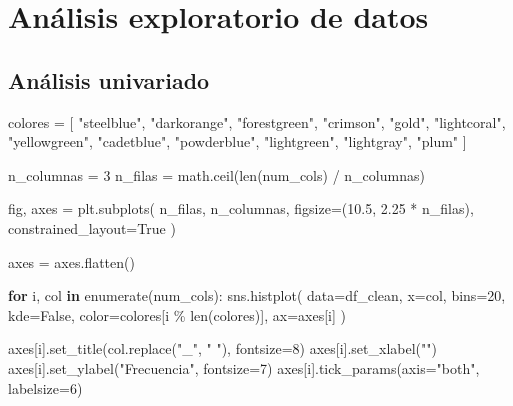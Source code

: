 \documentclass[11pt,spanish,a4paper,]{article}
\newenvironment{Shaded}{\begin{snugshade}}{\end{snugshade}}
\newcommand{\BuiltInTok}[1]{\textcolor[rgb]{0.00,0.23,0.31}{#1}}
\newcommand{\ControlFlowTok}[1]{\textcolor[rgb]{0.00,0.23,0.31}{\textbf{#1}}}
\newcommand{\DecValTok}[1]{\textcolor[rgb]{0.68,0.00,0.00}{#1}}
\newcommand{\FloatTok}[1]{\textcolor[rgb]{0.68,0.00,0.00}{#1}}
\newcommand{\KeywordTok}[1]{\textcolor[rgb]{0.00,0.23,0.31}{\textbf{#1}}}
\newcommand{\NormalTok}[1]{\textcolor[rgb]{0.00,0.23,0.31}{#1}}
\newcommand{\OperatorTok}[1]{\textcolor[rgb]{0.37,0.37,0.37}{#1}}
\newcommand{\StringTok}[1]{\textcolor[rgb]{0.13,0.47,0.30}{#1}}
\newcommand{\VariableTok}[1]{\textcolor[rgb]{0.07,0.07,0.07}{#1}}
\begin{document}
\newpage

\section{Análisis exploratorio de
datos}\label{anuxe1lisis-exploratorio-de-datos}

\subsection{Análisis univariado}\label{anuxe1lisis-univariado}

\begin{Shaded}
\begin{Highlighting}[]
\NormalTok{colores }\OperatorTok{=}\NormalTok{ [}
    \StringTok{"steelblue"}\NormalTok{, }\StringTok{"darkorange"}\NormalTok{, }\StringTok{"forestgreen"}\NormalTok{,}
    \StringTok{"crimson"}\NormalTok{, }\StringTok{"gold"}\NormalTok{, }\StringTok{"lightcoral"}\NormalTok{,}
    \StringTok{"yellowgreen"}\NormalTok{, }\StringTok{"cadetblue"}\NormalTok{, }\StringTok{"powderblue"}\NormalTok{,}
    \StringTok{"lightgreen"}\NormalTok{, }\StringTok{"lightgray"}\NormalTok{, }\StringTok{"plum"}
\NormalTok{]}

\NormalTok{n\_columnas }\OperatorTok{=} \DecValTok{3}
\NormalTok{n\_filas }\OperatorTok{=}\NormalTok{ math.ceil(}\BuiltInTok{len}\NormalTok{(num\_cols) }\OperatorTok{/}\NormalTok{ n\_columnas)}

\NormalTok{fig, axes }\OperatorTok{=}\NormalTok{ plt.subplots(}
\NormalTok{    n\_filas,}
\NormalTok{    n\_columnas,}
\NormalTok{    figsize}\OperatorTok{=}\NormalTok{(}\FloatTok{10.5}\NormalTok{, }\FloatTok{2.25} \OperatorTok{*}\NormalTok{ n\_filas),}
\NormalTok{    constrained\_layout}\OperatorTok{=}\VariableTok{True}
\NormalTok{)}

\NormalTok{axes }\OperatorTok{=}\NormalTok{ axes.flatten()}

\ControlFlowTok{for}\NormalTok{ i, col }\KeywordTok{in} \BuiltInTok{enumerate}\NormalTok{(num\_cols):}
\NormalTok{    sns.histplot(}
\NormalTok{        data}\OperatorTok{=}\NormalTok{df\_clean,}
\NormalTok{        x}\OperatorTok{=}\NormalTok{col,}
\NormalTok{        bins}\OperatorTok{=}\DecValTok{20}\NormalTok{,}
\NormalTok{        kde}\OperatorTok{=}\VariableTok{False}\NormalTok{,}
\NormalTok{        color}\OperatorTok{=}\NormalTok{colores[i }\OperatorTok{\%} \BuiltInTok{len}\NormalTok{(colores)],}
\NormalTok{        ax}\OperatorTok{=}\NormalTok{axes[i]}
\NormalTok{    )}

\NormalTok{    axes[i].set\_title(col.replace(}\StringTok{"\_"}\NormalTok{, }\StringTok{" "}\NormalTok{), fontsize}\OperatorTok{=}\DecValTok{8}\NormalTok{)}
\NormalTok{    axes[i].set\_xlabel(}\StringTok{""}\NormalTok{)}
\NormalTok{    axes[i].set\_ylabel(}\StringTok{"Frecuencia"}\NormalTok{, fontsize}\OperatorTok{=}\DecValTok{7}\NormalTok{)}
\NormalTok{    axes[i].tick\_params(axis}\OperatorTok{=}\StringTok{"both"}\NormalTok{, labelsize}\OperatorTok{=}\DecValTok{6}\NormalTok{)}


\end{Highlighting}
\end{Shaded}
\end{document}
